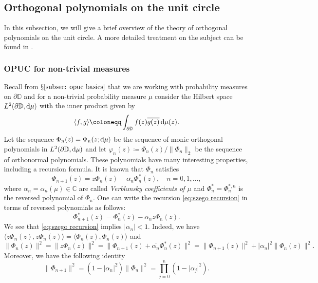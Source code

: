 \documentclass[reqno, a4paper]{amsart}
\renewcommand{\d}{\text{\rm d}}
\newcommand{\dD}{\partial\mathbb{D}}
\theoremstyle{plain}
\theoremstyle{definition}
\theoremstyle{remarkstyle}
\numberwithin{equation}{section}
\begin{document}
\subsection{Orthogonal polynomials on the unit circle}\label{subsec: opuc in detail}
In this subsection, we will give a brief overview of the theory of orthogonal polynomials on the unit circle. A more detailed treatment on the subject can be found in \cite{SimonPart1OrthogonalPolynomialsUnitCircle2005}. 

\subsubsection{OPUC for non-trivial measures}
Recall from $\mathsection \ref{subsec: opuc basics}$ that we are working with probability measures on $\dD$ and for a non-trivial probability measure $\mu$ consider the Hilbert space $L^2(\dD, \d\mu)$ with the inner product given by 
\begin{equation*}
    \langle f, g\rangle\coloneqq \int_{\dD} f(z)\overline{g(z)}\,\d\mu(z).
\end{equation*}
Let the sequence $\Phi_n(z)=\Phi_n(z; \d\mu)$ be the sequence of monic orthogonal polynomials in $L^2(\dD, \d\mu)$ and let $\varphi_n(z)\coloneqq \Phi_n(z)/\lVert \Phi_n\rVert_2$ be the sequence of orthonormal polynomials. These polynomials have many interesting properties, including a recursion formula. It is known that  $\Phi_n$ satisfies 
\begin{equation}\label{eq:szego recursion}
    \Phi_{n+1}(z)=z \Phi_{n}(z) -\overline{\alpha_n}\Phi_{n}^{\ast}(z), \quad n=0, 1, \ldots, 
\end{equation}
where $\alpha_n=\alpha_n(\mu) \in \mathbb{C}$ are called \emph{Verblunsky coefficients of $\mu$} and $\Phi_n^\ast=\Phi_n^{\ast,n}$ is the reversed polynomial of $\Phi_n$. One can write the recursion \eqref{eq:szego recursion} in terms of reversed polynomials as follows: 
\begin{equation}\label{eq:szego recursion for reversed polynomials}
        \Phi_{n+1}^*(z)=\Phi_{n}^*(z)-\alpha_{n} z \Phi_{n}(z).
\end{equation}
We see that \eqref{eq:szego recursion} implies $\lvert \alpha_n \rvert<1$. Indeed, we have $\langle z\Phi_n(z), z\Phi_n(z)\rangle=\langle \Phi_n(z), \Phi_n(z)\rangle$ and 
\begin{equation*}
\lVert \Phi_n(z)\rVert^2=\lVert z\Phi_n(z)\rVert^2=\lVert \Phi_{n+1}(z)+\overline{\alpha_n}\Phi_n^*(z)\rVert^2=  \lVert \Phi_{n+1}(z)\rVert^2 + \lvert \alpha_n\rvert^2 \lVert \Phi_n(z)\rVert^2.  
\end{equation*}
Moreover, we have the following identity
\begin{equation}\label{eq:norm via verblunsky coefficients}
    \lVert \Phi_{n+1}\rVert^2=(1-\lvert \alpha_n\rvert^2) \lVert \Phi_{n}\rVert^2=\prod_{j=0}^n(1-\lvert \alpha_j\rvert^2).
\end{equation}
\end{document}
